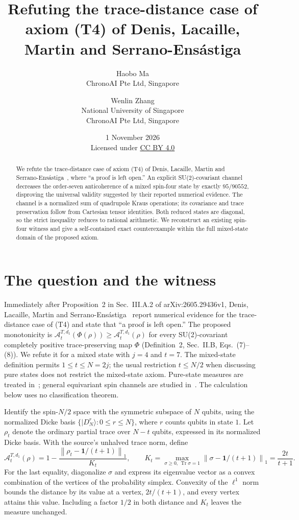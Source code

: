 \documentclass[11pt]{article}
\title{Refuting the trace-distance case of axiom (T4) of Denis, Lacaille, Martin and Serrano-Ens\'astiga}
\author{Haobo Ma\\\small ChronoAI Pte Ltd, Singapore
\and Wenlin Zhang\\\small National University of Singapore\\
\small ChronoAI Pte Ltd, Singapore}
\date{1 November 2026\\\small Licensed under
\href{https://creativecommons.org/licenses/by/4.0/}{CC BY 4.0}}
\newcommand{\Tr}{\operatorname{Tr}}
\newcommand{\id}{\mathbf{1}}
\newcommand{\A}{\mathcal{A}}
\newcommand{\normone}[1]{\left\lVert #1\right\rVert_1}
\begin{document}
\maketitle
\begin{abstract}
We refute the trace-distance case of axiom (T4) of Denis, Lacaille, Martin and
Serrano-Ens\'astiga~\cite[Sec.~III.A.2, Eq.~(22) with $p=1$; (T4) in
Sec.~II.B, Eqs.~(7)--(8)]{DLMS}, where ``a proof is left open.''
An explicit SU(2)-covariant channel decreases the order-seven anticoherence of
a mixed spin-four state by exactly $95/90552$, disproving the universal
validity suggested by their reported numerical evidence.
The channel is a normalized sum of quadrupole Kraus operations;
its covariance and trace preservation follow from Cartesian tensor identities.
Both reduced states are diagonal, so the strict inequality reduces to rational
arithmetic. We reconstruct an existing spin-four witness and give a self-contained
exact counterexample within the full mixed-state domain of the proposed axiom.
\end{abstract}

\section{The question and the witness}
Immediately after Proposition~2 in Sec.~III.A.2 of arXiv:2605.29436v1,
Denis, Lacaille, Martin and Serrano-Ens\'astiga~\cite{DLMS} report numerical
evidence for the trace-distance case of (T4) and state that
``a proof is left open.'' The proposed monotonicity is
$\A_t^{T,d_1}(\Phi(\rho))\geq\A_t^{T,d_1}(\rho)$ for every
SU(2)-covariant completely positive trace-preserving map $\Phi$
(Definition~2, Sec.~II.B, Eqs.~(7)--(8)). We refute it for a mixed state with
$j=4$ and $t=7$.
The mixed-state definition permits $1\leq t\leq N=2j$; the usual restriction
$t\leq N/2$ when discussing pure states does not restrict the mixed-state axiom.
Pure-state measures are treated in~\cite{BM}; general equivariant spin
channels are studied in~\cite{ARS}. The calculation below uses no
classification theorem.

Identify the spin-$N/2$ space with the symmetric subspace of $N$ qubits, using
the normalized Dicke basis $\{|D_N^r\rangle:0\leq r\leq N\}$,
where $r$ counts qubits in state $1$. Let $\rho_t$ denote the ordinary
partial trace over $N-t$ qubits, expressed in its normalized Dicke basis.
With the source's unhalved trace norm, define
\begin{equation}\label{eq:measure}
 \A_t^{T,d_1}(\rho)=1-
 \frac{\normone{\rho_t-\id/(t+1)}}{K_t},\qquad
 K_t=\max_{\sigma\geq0,\,\Tr\sigma=1}
 \normone{\sigma-\id/(t+1)}=\frac{2t}{t+1}.
\end{equation}
For the last equality, diagonalize $\sigma$ and express its eigenvalue vector
as a convex combination of the vertices of the probability simplex.
Convexity of the $\ell^1$ norm bounds the distance by its value at a vertex,
$2t/(t+1)$, and every vertex attains this value. Including a factor $1/2$
in both distance and $K_t$ leaves the measure unchanged.
\end{document}
